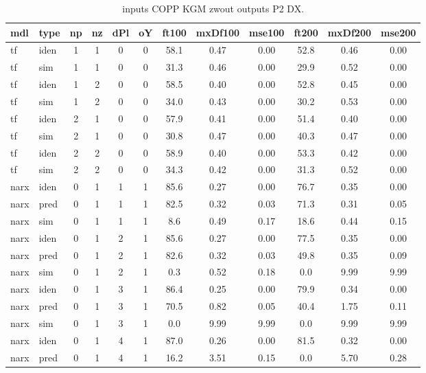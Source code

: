 \begin{center} 
\begin{longtable}{ll|cccc|ccc|ccc} 
\caption[inputs COPP KGM zwout   outputs P2 DX]{inputs COPP KGM zwout   outputs P2 DX.} 
\label{tab:inputs_COPP_KGM_zwout___outputs_P2_DX} 
\hline 
  mdl & type & np & nz & dPl & oY & ft100 & mxDf100 & mse100 & ft200 & mxDf200 & mse200 \\ 
 \hline 
tf  & iden & 1 & 1 & 0 & 0 & 58.1 & 0.47 & 0.00 & 52.8 & 0.46 & 0.00 \\ 
tf  & sim & 1 & 1 & 0 & 0 & 31.3 & 0.46 & 0.00 & 29.9 & 0.52 & 0.00 \\ 
 \hline 
tf  & iden & 1 & 2 & 0 & 0 & 58.5 & 0.40 & 0.00 & 52.8 & 0.45 & 0.00 \\ 
tf  & sim & 1 & 2 & 0 & 0 & 34.0 & 0.43 & 0.00 & 30.2 & 0.53 & 0.00 \\ 
 \hline 
tf  & iden & 2 & 1 & 0 & 0 & 57.9 & 0.41 & 0.00 & 51.4 & 0.40 & 0.00 \\ 
tf  & sim & 2 & 1 & 0 & 0 & 30.8 & 0.47 & 0.00 & 40.3 & 0.47 & 0.00 \\ 
 \hline 
tf  & iden & 2 & 2 & 0 & 0 & 58.9 & 0.40 & 0.00 & 53.3 & 0.42 & 0.00 \\ 
tf  & sim & 2 & 2 & 0 & 0 & 34.3 & 0.42 & 0.00 & 31.3 & 0.52 & 0.00 \\ 
 \hline 
narx & iden & 0 & 1 & 1 & 1 & 85.6 & 0.27 & 0.00 & 76.7 & 0.35 & 0.00 \\ 
narx & pred & 0 & 1 & 1 & 1 & 82.5 & 0.32 & 0.03 & 71.3 & 0.31 & 0.05 \\ 
narx & sim & 0 & 1 & 1 & 1 & 8.6 & 0.49 & 0.17 & 18.6 & 0.44 & 0.15 \\ 
 \hline 
narx & iden & 0 & 1 & 2 & 1 & 85.6 & 0.27 & 0.00 & 77.5 & 0.35 & 0.00 \\ 
narx & pred & 0 & 1 & 2 & 1 & 82.6 & 0.32 & 0.03 & 49.8 & 0.35 & 0.09 \\ 
narx & sim & 0 & 1 & 2 & 1 & 0.3 & 0.52 & 0.18 & 0.0 & 9.99 & 9.99 \\ 
 \hline 
narx & iden & 0 & 1 & 3 & 1 & 86.4 & 0.25 & 0.00 & 79.9 & 0.34 & 0.00 \\ 
narx & pred & 0 & 1 & 3 & 1 & 70.5 & 0.82 & 0.05 & 40.4 & 1.75 & 0.11 \\ 
narx & sim & 0 & 1 & 3 & 1 & 0.0 & 9.99 & 9.99 & 0.0 & 9.99 & 9.99 \\ 
 \hline 
narx & iden & 0 & 1 & 4 & 1 & 87.0 & 0.26 & 0.00 & 81.5 & 0.32 & 0.00 \\ 
narx & pred & 0 & 1 & 4 & 1 & 16.2 & 3.51 & 0.15 & 0.0 & 5.70 & 0.28 \\ 

\end{longtable}
\end{center}
